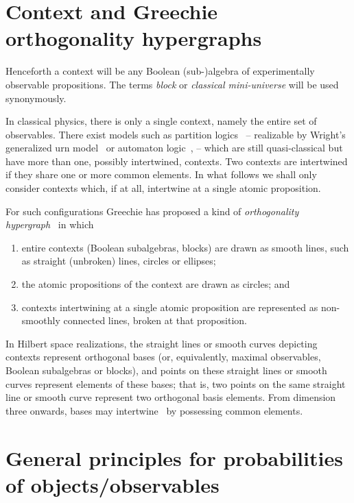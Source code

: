 \section{Context and Greechie orthogonality hypergraphs}
\label{2017-b-cagod}

Henceforth a context will be any Boolean (sub-)algebra of experimentally observable propositions.
The terms {\em block} or {\em classical mini-universe} will be used synonymously.

In classical physics, there is only a single context, namely the entire set of observables.
There exist models such as partition logics~\cite{dvur-pul-svo,svozil-2001-eua,svozil-2008-ql}
-- realizable by Wright's generalized urn model~\cite{wright} or automaton logic~\cite{schaller-92,svozil-93,schaller-95,schaller-96},
-- which are still quasi-classical but have more than one, possibly intertwined, contexts.
Two contexts are intertwined if they share one or more common elements.
In what follows we shall only consider contexts which, if at all, intertwine at a single atomic proposition.

For such configurations Greechie has proposed a kind of {\em orthogonality hypergraph}~\cite{greechie:71,kalmbach-83,svozil-tkadlec}
in which
\begin{enumerate}
\item
entire contexts (Boolean subalgebras, blocks) are drawn as smooth lines, such as straight (unbroken) lines, circles or ellipses;
\item
the atomic propositions of the context are drawn as circles; and
\item
contexts intertwining at a single atomic proposition are represented as non-smoothly connected lines, broken at that proposition.
\end{enumerate}

In Hilbert space realizations,
the straight lines or smooth curves depicting contexts represent orthogonal bases (or, equivalently, maximal observables, Boolean subalgebras or blocks),
and points on these straight lines or smooth curves represent elements of these bases;
that is, two points on the same straight line or smooth curve represent two orthogonal basis elements.
From dimension three onwards, bases may intertwine~\cite{Gleason} by possessing common elements.



\section{General principles for probabilities of objects/observables}

